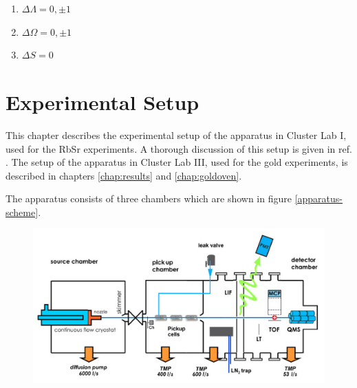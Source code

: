 \documentclass[parskip,12pt,headsepline,a4paper] {scrbook}
\begin{document}
\begin{enumerate}
\item $\Delta \Lambda = 0, \pm 1$
\item $\Delta \Omega = 0, \pm1$
\item $\Delta S = 0$
\end{enumerate}



\chapter{Experimental Setup}
\label{chap:expsetup}
This chapter describes the experimental setup of the apparatus in Cluster Lab I, used for the RbSr experiments. A thorough discussion of this setup is given in ref. \cite{nagl}. The setup of the apparatus in Cluster Lab III, used for the gold experiments, is described in chapters \ref{chap:results} and \ref{chap:goldoven}.

The apparatus consists of three chambers which are shown in figure \ref{apparatus-scheme}.



\begin{figure}[ht]
\centerline{
\includegraphics[width=13cm]{./experimental_setup/scheme.jpg}}
\end{figure}
\end{document}
